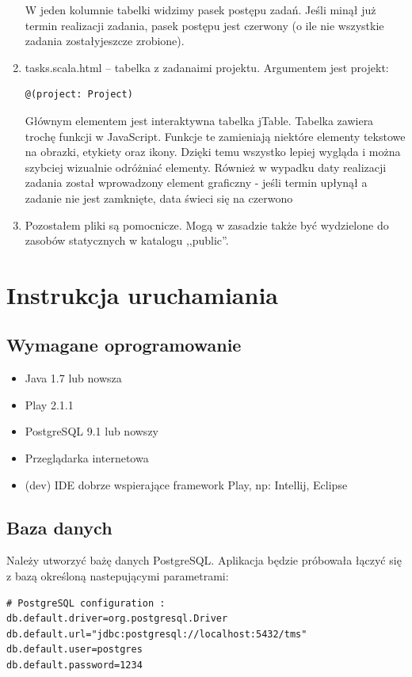 \documentclass[a4paper,12pt,notitlepage]{mwrep}
\begin{document}
\begin{enumerate}
		W jeden kolumnie tabelki widzimy pasek postępu zadań. Jeśli minął już termin realizacji zadania, pasek postępu jest czerwony (o ile 
		nie wszystkie zadania zostałyjeszcze zrobione).
	\item	tasks.scala.html -- tabelka z zadanaimi projektu. Argumentem jest projekt:
		\begin{verbatim}@(project: Project)\end{verbatim}
		Głównym elementem jest interaktywna tabelka jTable. Tabelka zawiera trochę funkcji w JavaScript. Funkcje te zamieniają niektóre elementy 
		tekstowe na obrazki, etykiety oraz ikony. Dzięki temu wszystko lepiej wygląda i można szybciej wizualnie odróżniać elementy. Również 
		w wypadku daty realizacji zadania został wprowadzony element graficzny - jeśli termin upłynął a zadanie nie jest zamknięte, data świeci 
		się na czerwono
	\item	Pozostałem pliki są pomocnicze. Mogą w zasadzie także być wydzielone do zasobów statycznych w katalogu ,,public''.
	
\end{enumerate}

\chapter{Instrukcja uruchamiania}
\section{Wymagane oprogramowanie}
\begin{itemize}
	\item	Java 1.7 lub nowsza
	\item	Play 2.1.1
	\item	PostgreSQL 9.1 lub nowszy
	\item	Przeglądarka internetowa
	\item	(dev) IDE dobrze wspierające framework Play, np: Intellij, Eclipse
\end{itemize}

\section{Baza danych}
Należy utworzyć bażę danych PostgreSQL. Aplikacja będzie próbowała łączyć się z bazą określoną
nastepującymi parametrami:
\begin{verbatim}
# PostgreSQL configuration :
db.default.driver=org.postgresql.Driver
db.default.url="jdbc:postgresql://localhost:5432/tms"
db.default.user=postgres
db.default.password=1234
\end{verbatim}
\end{document}
